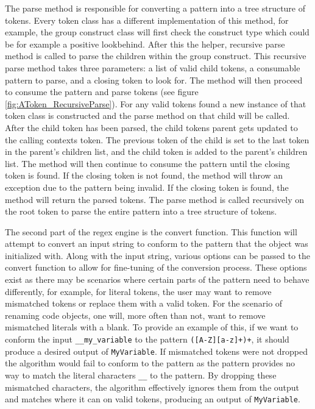The parse method is responsible for converting a pattern into a tree structure of tokens. Every token class has a different implementation of this method, for example, the group construct class will first check the construct type which could be for example a positive lookbehind. After this the helper, recursive parse method is called to parse the children within the group construct. This recursive parse method takes three parameters: a list of valid child tokens, a consumable pattern to parse, and a closing token to look for. The method will then proceed to consume the pattern and parse tokens (see figure \ref{fig:AToken_RecursiveParse}). For any valid tokens found a new instance of that token class is constructed and the parse method on that child will be called. After the child token has been parsed, the child tokens parent gets updated to the calling contexts token. The previous token of the child is set to the last token in the parent's children list, and the child token is added to the parent's children list. The method will then continue to consume the pattern until the closing token is found. If the closing token is not found, the method will throw an exception due to the pattern being invalid. If the closing token is found, the method will return the parsed tokens. The parse method is called recursively on the root token to parse the entire pattern into a tree structure of tokens.

The second part of the regex engine is the convert function. This function will attempt to convert an input string to conform to the pattern that the object was initialized with.
Along with the input string, various options can be passed to the convert function to allow for fine-tuning of the conversion process. These options exist as there may be scenarios where certain parts of the pattern need to behave differently, for example, for literal tokens, the user may want to remove mismatched tokens or replace them with a valid token.
For the scenario of renaming code objects, one will, more often than not, want to remove mismatched literals with a blank. To provide an example of this, if we want to conform the input \texttt{\_\_my\_variable} to the pattern \texttt{([A-Z][a-z]+)+}, it should produce a desired output of \texttt{MyVariable}. If mismatched tokens were not dropped the algorithm would fail to conform to the pattern as the pattern provides no way to match the literal characters \texttt{\_\_} to the pattern. By dropping these mismatched characters, the algorithm effectively ignores them from the output and matches where it can on valid tokens, producing an output of \texttt{MyVariable}.

